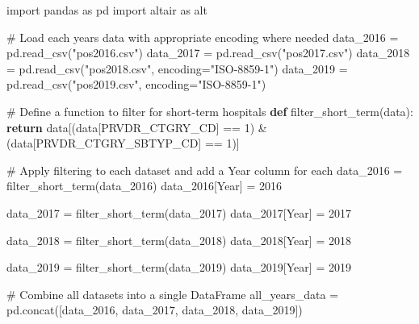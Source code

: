 \documentclass[
  letterpaper,
  DIV=11,
  numbers=noendperiod]{scrartcl}
\newenvironment{Shaded}{\begin{snugshade}}{\end{snugshade}}
\newcommand{\CommentTok}[1]{\textcolor[rgb]{0.37,0.37,0.37}{#1}}
\newcommand{\ControlFlowTok}[1]{\textcolor[rgb]{0.00,0.23,0.31}{\textbf{#1}}}
\newcommand{\DecValTok}[1]{\textcolor[rgb]{0.68,0.00,0.00}{#1}}
\newcommand{\ImportTok}[1]{\textcolor[rgb]{0.00,0.46,0.62}{#1}}
\newcommand{\KeywordTok}[1]{\textcolor[rgb]{0.00,0.23,0.31}{\textbf{#1}}}
\newcommand{\NormalTok}[1]{\textcolor[rgb]{0.00,0.23,0.31}{#1}}
\newcommand{\OperatorTok}[1]{\textcolor[rgb]{0.37,0.37,0.37}{#1}}
\newcommand{\StringTok}[1]{\textcolor[rgb]{0.13,0.47,0.30}{#1}}
\begin{document}
\begin{Shaded}
\begin{Highlighting}[]
\ImportTok{import}\NormalTok{ pandas }\ImportTok{as}\NormalTok{ pd}
\ImportTok{import}\NormalTok{ altair }\ImportTok{as}\NormalTok{ alt}

\CommentTok{\# Load each year\textquotesingle{}s data with appropriate encoding where needed}
\NormalTok{data\_2016 }\OperatorTok{=}\NormalTok{ pd.read\_csv(}\StringTok{"pos2016.csv"}\NormalTok{)}
\NormalTok{data\_2017 }\OperatorTok{=}\NormalTok{ pd.read\_csv(}\StringTok{"pos2017.csv"}\NormalTok{)}
\NormalTok{data\_2018 }\OperatorTok{=}\NormalTok{ pd.read\_csv(}\StringTok{"pos2018.csv"}\NormalTok{, encoding}\OperatorTok{=}\StringTok{"ISO{-}8859{-}1"}\NormalTok{)}
\NormalTok{data\_2019 }\OperatorTok{=}\NormalTok{ pd.read\_csv(}\StringTok{"pos2019.csv"}\NormalTok{, encoding}\OperatorTok{=}\StringTok{"ISO{-}8859{-}1"}\NormalTok{)}

\CommentTok{\# Define a function to filter for short{-}term hospitals}
\KeywordTok{def}\NormalTok{ filter\_short\_term(data):}
    \ControlFlowTok{return}\NormalTok{ data[(data[}\StringTok{\textquotesingle{}PRVDR\_CTGRY\_CD\textquotesingle{}}\NormalTok{] }\OperatorTok{==} \DecValTok{1}\NormalTok{) }\OperatorTok{\&}\NormalTok{ (data[}\StringTok{\textquotesingle{}PRVDR\_CTGRY\_SBTYP\_CD\textquotesingle{}}\NormalTok{] }\OperatorTok{==} \DecValTok{1}\NormalTok{)]}

\CommentTok{\# Apply filtering to each dataset and add a \textquotesingle{}Year\textquotesingle{} column for each}
\NormalTok{data\_2016 }\OperatorTok{=}\NormalTok{ filter\_short\_term(data\_2016)}
\NormalTok{data\_2016[}\StringTok{\textquotesingle{}Year\textquotesingle{}}\NormalTok{] }\OperatorTok{=} \DecValTok{2016}

\NormalTok{data\_2017 }\OperatorTok{=}\NormalTok{ filter\_short\_term(data\_2017)}
\NormalTok{data\_2017[}\StringTok{\textquotesingle{}Year\textquotesingle{}}\NormalTok{] }\OperatorTok{=} \DecValTok{2017}

\NormalTok{data\_2018 }\OperatorTok{=}\NormalTok{ filter\_short\_term(data\_2018)}
\NormalTok{data\_2018[}\StringTok{\textquotesingle{}Year\textquotesingle{}}\NormalTok{] }\OperatorTok{=} \DecValTok{2018}

\NormalTok{data\_2019 }\OperatorTok{=}\NormalTok{ filter\_short\_term(data\_2019)}
\NormalTok{data\_2019[}\StringTok{\textquotesingle{}Year\textquotesingle{}}\NormalTok{] }\OperatorTok{=} \DecValTok{2019}

\CommentTok{\# Combine all datasets into a single DataFrame}
\NormalTok{all\_years\_data }\OperatorTok{=}\NormalTok{ pd.concat([data\_2016, data\_2017, data\_2018, data\_2019])}


\end{Highlighting}
\end{Shaded}
\end{document}
